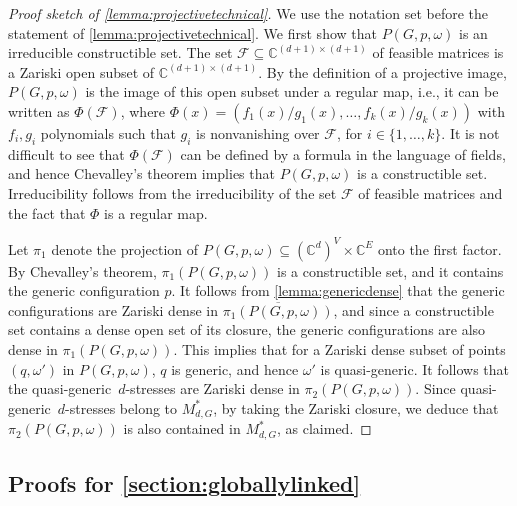 \documentclass[11pt,a4paper,dvipsnames]{scrartcl}
\theoremstyle{definition}
\newcommand{\CC}{\mathbb{C}}
\newcommand{\quasigen}{quasi-generic}
\begin{document}
\begin{proof}[Proof sketch of \cref{lemma:projectivetechnical}]
    We use the notation set before the statement of \cref{lemma:projectivetechnical}. We first show that $P(G,p,\omega)$ is an irreducible constructible set. The set $\mathcal{F} \subseteq \CC^{(d+1) \times (d+1)}$ of feasible matrices is a Zariski open subset of $\CC^{(d+1) \times (d+1)}$. By the definition of a projective image, $P(G,p,\omega)$ is the image of this open subset under a regular map, i.e., it can be written as $\Phi(\mathcal{F})$, where $\Phi(x) = (f_1(x)/g_1(x),\ldots,f_k(x)/g_k(x))$ with $f_i,g_i$ polynomials such that $g_i$ is nonvanishing over $\mathcal{F}$, for $i \in \{1,\ldots,k\}$. It is not difficult to see that $\Phi(\mathcal{F})$ can be defined by a formula in the language of fields, and hence Chevalley's theorem implies that $P(G,p,\omega)$ is a constructible set. Irreducibility follows from the irreducibility of the set $\mathcal{F}$ of feasible matrices and the fact that $\Phi$ is a regular map.
    
    Let $\pi_1$ denote the projection of $P(G,p,\omega) \subseteq (\CC^{d})^V \times \CC^E$ onto the first factor. By Chevalley's theorem, $\pi_1(P(G,p,\omega))$ is a constructible set, and it contains the generic configuration $p$. It follows from \cref{lemma:genericdense} that the generic configurations are Zariski dense in $\overline{\pi_1(P(G,p,\omega))}$, and since a constructible set contains a dense open set of its closure, the generic configurations are also dense in $\pi_1(P(G,p,\omega))$. This implies that for a Zariski dense subset of points $(q,\omega')$ in $P(G,p,\omega)$, $q$ is generic, and hence $\omega'$ is \quasigen. It follows that the \quasigen\ $d$-stresses are Zariski dense in $\pi_2(P(G,p,\omega))$. Since \quasigen\ $d$-stresses belong to $M_{d,G}^*$, by taking the Zariski closure, we deduce that $\pi_2(P(G,p,\omega))$ is also contained in $M_{d,G}^*$, as claimed.
\end{proof}


\subsection{Proofs for \texorpdfstring{\cref{section:globallylinked}}{Section 4}}\label{appendix:stresslinked}
\end{document}
